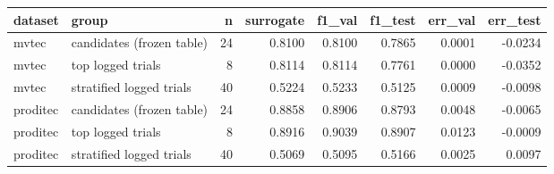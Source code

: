 \begin{tabular}{llrrrrrr}
\toprule
 dataset &                     group &  n &  surrogate &  f1\_val &  f1\_test &  err\_val &  err\_test \\
\midrule
   mvtec & candidates (frozen table) & 24 &     0.8100 &  0.8100 &   0.7865 &   0.0001 &   -0.0234 \\
   mvtec &         top logged trials &  8 &     0.8114 &  0.8114 &   0.7761 &   0.0000 &   -0.0352 \\
   mvtec &  stratified logged trials & 40 &     0.5224 &  0.5233 &   0.5125 &   0.0009 &   -0.0098 \\
proditec & candidates (frozen table) & 24 &     0.8858 &  0.8906 &   0.8793 &   0.0048 &   -0.0065 \\
proditec &         top logged trials &  8 &     0.8916 &  0.9039 &   0.8907 &   0.0123 &   -0.0009 \\
proditec &  stratified logged trials & 40 &     0.5069 &  0.5095 &   0.5166 &   0.0025 &    0.0097 \\
\bottomrule
\end{tabular}

